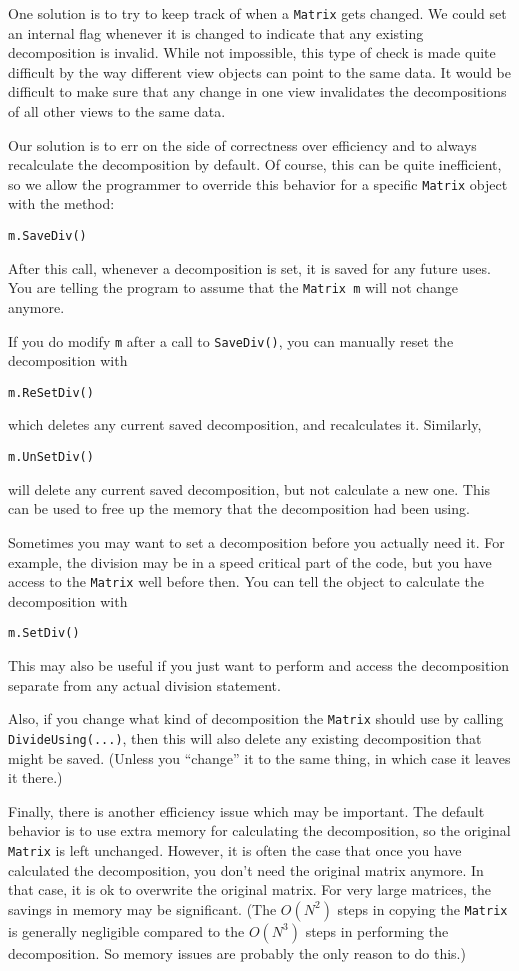 \documentclass[twoside,letterpaper,11pt]{article}
\renewcommand{\tt}[1]{{\texttt {#1}}}
\begin{document}
One solution is to try to keep track of when a \tt{Matrix} gets changed.  
We could set an
internal flag whenever it is changed to indicate that
any existing decomposition is invalid.  While not impossible,
this type of check is made
quite difficult by the way different view objects can point to the same data.  
It would
be difficult to make sure that any change in one view invalidates the decompositions
of all other views to the same data.

Our solution is to err on the side of correctness over efficiency and
to always recalculate the decomposition by default.  Of course, this
can be quite inefficient, so we allow the programmer to override this
behavior for a specific \tt{Matrix} object with the method:
\begin{verbatim}
m.SaveDiv()
\end{verbatim}
After this call, whenever a decomposition is set, it is saved for any future uses.
You are telling the program to assume that the \tt{Matrix m} will not change anymore.

If you do modify \tt{m} after a call to \tt{SaveDiv()}, 
you can manually reset the decomposition with
\begin{verbatim}
m.ReSetDiv()
\end{verbatim}
which deletes any current saved decomposition, and recalculates it.
Similarly,
\begin{verbatim}
m.UnSetDiv()
\end{verbatim}
will delete any current saved decomposition, but not calculate a new one.
This can be used to free up the memory that the decomposition had been using.

Sometimes you may want to set a decomposition before you actually need it.
For example, the division may be in a speed critical part of the code, but you have
access to the \tt{Matrix} well before then.  You can tell the object to calculate 
the decomposition with
\begin{verbatim}
m.SetDiv()
\end{verbatim}
This may also be useful if you just want to perform and access the decomposition
separate from any actual division statement.

Also, if you change what kind of decomposition the \tt{Matrix} should use by calling
\tt{DivideUsing(...)}, then this will also delete any existing decomposition that 
might be saved.  (Unless you ``change'' it to the same thing, in which case it
leaves it there.)

Finally, there is another efficiency issue which may be important.  The default
behavior is to use extra memory for calculating the decomposition, so the original
\tt{Matrix} is left unchanged.  However, it is often the case that once you have 
calculated the decomposition, you don't need the original matrix anymore.
In that case, it is ok to overwrite the original matrix.  For very large matrices, 
the savings in memory may be significant.  (The $O(N^2)$ steps in copying 
the \tt{Matrix} is generally negligible compared to the $O(N^3)$ steps in performing
the decomposition.  So memory issues are probably the only reason to do this.)
\end{document}

